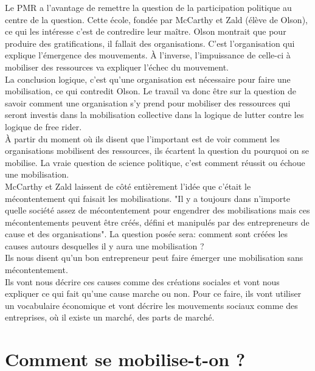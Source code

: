 \documentclass[10pt, a4paper, openany]{book}
\begin{document}
Le PMR a l'avantage de remettre la question de la participation politique au centre de la question. Cette école, fondée par McCarthy et Zald (élève de Olson), ce qui les intéresse c'est de contredire leur maître. Olson montrait que pour produire des gratifications, il fallait des organisations. C'est l'organisation qui explique l'émergence des mouvements. À l'inverse, l'impuissance de celle-ci à mobiliser des ressources va expliquer l'échec du mouvement. \\
La conclusion logique, c'est qu'une organisation est nécessaire pour faire une mobilisation, ce qui contredit Olson. Le travail va donc être sur la question de savoir comment une organisation s'y prend pour mobiliser des ressources qui seront investis dans la mobilisation collective dans la logique de lutter contre les logique de free rider. \\
À partir du moment où ils disent que l'important est de voir comment les organisations mobilisent des ressources, ils écartent la question du pourquoi on se mobilise. La vraie question de science politique, c'est comment réussit ou échoue une mobilisation. \\
McCarthy et Zald laissent de côté entièrement l'idée que c'était le mécontentement qui faisait les mobilisations. "Il y a toujours dans n'importe quelle société assez de mécontentement pour engendrer des mobilisations mais ces mécontentements peuvent être créés, défini et manipulés par des entrepreneurs de cause et des organisations". La question posée sera: comment sont créées les causes autours desquelles il y aura une mobilisation ? \\
Ils nous disent qu'un bon entrepreneur peut faire émerger une mobilisation sans mécontentement. \\
Ils vont nous décrire ces causes comme des créations sociales et vont nous expliquer ce qui fait qu'une cause marche ou non. Pour ce faire, ils vont utiliser un vocabulaire économique et vont décrire les mouvements sociaux comme des entreprises, où il existe un marché, des parts de marché. 
































\part{Comment se mobilise-t-on ?}
\end{document}
